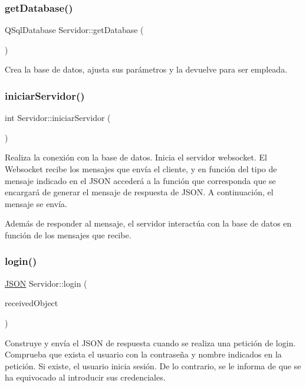 \subsubsection{\texorpdfstring{get\+Database()}{getDatabase()}}
{\footnotesize\ttfamily Q\+Sql\+Database Servidor\+::get\+Database (\begin{DoxyParamCaption}{ }\end{DoxyParamCaption})}

Crea la base de datos, ajusta sus parámetros y la devuelve para ser empleada. \mbox{\label{classServidor_a2a7fdca08064f9e567c579a2cb34f267}} 
\subsubsection{\texorpdfstring{iniciar\+Servidor()}{iniciarServidor()}}
{\footnotesize\ttfamily int Servidor\+::iniciar\+Servidor (\begin{DoxyParamCaption}{ }\end{DoxyParamCaption})}

Realiza la conexión con la base de datos. Inicia el servidor websocket. El Websocket recibe los mensajes que envía el cliente, y en función del tipo de mensaje indicado en el J\+S\+ON accederá a la función que corresponda que se encargará de generar el mensaje de respuesta de J\+S\+ON. A continuación, el mensaje se envía.

Además de responder al mensaje, el servidor interactúa con la base de datos en función de los mensajes que recibe. \mbox{\label{classServidor_afa99d1a7d42e43c66c066aa8d4622fbf}} 
\subsubsection{\texorpdfstring{login()}{login()}}
{\footnotesize\ttfamily \mbox{\hyperlink{classnlohmann_1_1basic__json}{J\+S\+ON}} Servidor\+::login (\begin{DoxyParamCaption}\item[{\mbox{\hyperlink{classnlohmann_1_1basic__json}{J\+S\+ON}}}]{received\+Object }\end{DoxyParamCaption})}

Construye y envía el J\+S\+ON de respuesta cuando se realiza una petición de login. Comprueba que exista el usuario con la contraseña y nombre indicados en la petición. Si existe, el usuario inicia sesión. De lo contrario, se le informa de que se ha equivocado al introducir sus credenciales. \mbox{\label{classServidor_a612baa3e7a827632a48aacdc024e2a20}} 
